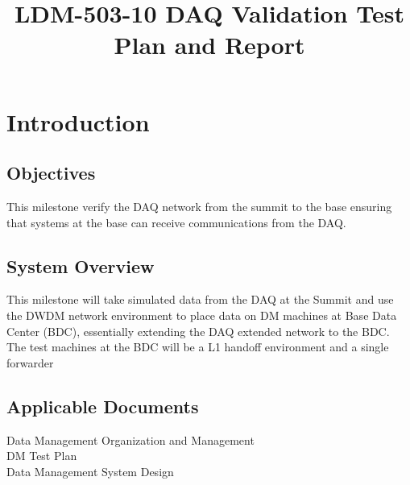 \documentclass[DM,lsstdraft,STR,toc]{lsstdoc}
\begin{document}
\def\milestoneName{DAQ Validation}
\def\milestoneId{LDM-503-10}
\def\product{Data Management}


\title{ LDM-503-10 DAQ Validation Test Plan and Report}
\setDocRef{\lsstDocType-\lsstDocNum}
\date{\vcsdate}
\author{  }






\maketitle

\section{Introduction}
\label{sect:intro}


\subsection{Objectives}
\label{sect:objectives}

This milestone verify the DAQ network from the summit to the base
ensuring that systems at the base can receive communications from the
DAQ.~~



\subsection{System Overview}
\label{sect:systemoverview}

This milestone will take simulated data from the DAQ at the Summit and
use the DWDM network environment to place data on DM machines at Base
Data Center (BDC), essentially extending the DAQ extended network to the
BDC. The test machines at the BDC will be a L1 handoff environment and a
single forwarder\\[2\baselineskip]

\subsection{Applicable Documents}\label{applicable-documents}

 Data Management Organization and Management\\
 DM Test Plan\\
 Data Management System Design
\end{document}
